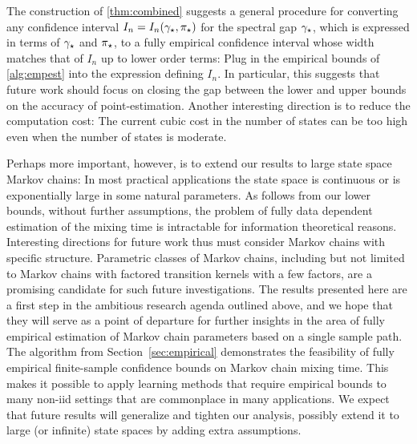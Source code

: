 The construction of \cref{thm:combined}
suggests a general procedure for converting
any confidence interval $I_n=I_n(\gamma_{\star},\pi_{\star})$ for the spectral gap $\gamma_{\star}$,
which
is expressed in terms of
$\gamma_{\star}$ and $\pi_{\star}$,
to a fully empirical confidence interval whose
width matches that of $I_n$ up to lower order terms:
Plug in the empirical bounds of \cref{alg:empest} into the expression defining $I_n$.
In particular, this suggests that future work should focus on 
closing the gap between the lower and upper bounds on the accuracy
of point-estimation. Another interesting direction is to 
reduce the computation cost: The current cubic cost in the number of states
can be too high even when the number of states is moderate.

Perhaps more important, however, is to extend 
our results to large state space Markov chains:
In most practical applications the state space is continuous
or is exponentially large in some natural parameters.
As follows from our lower bounds, without further assumptions,
the problem of fully data dependent estimation of the mixing time
is intractable for information theoretical reasons.
Interesting directions for future work thus must consider Markov
chains with specific structure. Parametric classes of Markov chains,
including but not limited to Markov chains with factored transition kernels
with a few factors, are a promising candidate for such future investigations.
The results presented here are a first step in the ambitious research agenda
outlined above, and we hope that they will
serve as a point of departure
for
further insights
in the area of fully empirical estimation of Markov chain 
parameters based on a single sample path.
The algorithm from Section~\ref{sec:empirical} demonstrates the
feasibility of fully empirical finite-sample confidence bounds on
Markov chain mixing time.
This makes it possible to apply learning methods that require
empirical bounds to many non-iid settings that are commonplace in many
applications.
We expect that future results will generalize and tighten our
analysis, possibly extend it to large (or infinite) state spaces by
adding extra assumptions.

